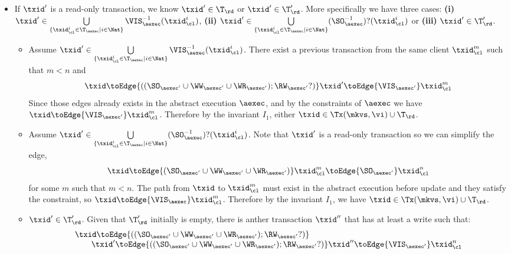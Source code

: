 \begin{itemize}
\begin{itemize}
\item If \( \txid' \) is a read-only transaction, we know \( \txid' \in \T_\rd \) or \( \txid' \in \T'_\rd \).
    More specifically we have three cases: \textbf{(i)} \( \txid' \in \bigcup\limits_{\{\txid_{\cl}^{i} \in \T_{\aexec} \mid i \in \Nat\}} \VIS_{\aexec}^{-1}(\txid^i_\cl) \), \textbf{(ii)} \( \txid' \in \bigcup\limits_{\{\txid_{\cl}^{i} \in \T_{\aexec} \mid i \in \Nat\}} (\SO_{\aexec}^{-1})?(\txid^i_\cl) \) or \textbf{(iii)} \( \txid' \in \T'_\rd\).
    \begin{itemize}
    \item Assume \( \txid' \in \bigcup\limits_{\{\txid_{\cl}^{i} \in \T_{\aexec} \mid i \in \Nat\}} \VIS_{\aexec}^{-1}(\txid^i_\cl) \).
        There exist a previous transaction from the same client \( \txid_\cl^m\) such that \( m < n \) and 
        \[ 
            \txid \toEdge{\left( (\SO_{\aexec'} \cup \WW_{\aexec'} \cup \WR_{\aexec'} ) ; \RW_{\aexec'}? \right) } \txid' \toEdge{\VIS_{\aexec'}}  \txid_\cl^m 
        \]
        Since those edges already exists in the abstract execution \( \aexec\), and by the constraints of \( \aexec \) we have \( \txid \toEdge{\VIS_{\aexec'}} \txid_\cl^m\).
        Therefore by the invariant \( I_1 \), either \( \txid \in \Tx(\mkvs, \vi) \cup \T_\rd \).
    \item Assume \( \txid' \in \bigcup\limits_{\{\txid_{\cl}^{i} \in \T_{\aexec} \mid i \in \Nat\}} (\SO_{\aexec}^{-1})?(\txid^i_\cl) \).
        Note that  \( \txid' \) is a read-only transaction so we can simplify the edge,
        \[ 
            \txid \toEdge{\left( \SO_{\aexec'} \cup \WW_{\aexec'} \cup \WR_{\aexec'}  \right)} \txid_\cl^m \toEdge{\SO_{\aexec'}}  \txid_\cl^n 
        \] 
        for some \( m \) such that \( m < n \).
        The path from \( \txid \) to \( \txid_\cl^m \) must exist in the abstract execution before update and they satisfy the constraint, so \( \txid \toEdge{\VIS_\aexec} \txid_\cl^m \).
        Therefore by the invariant \( I_1 \), we have \( \txid \in \Tx(\mkvs, \vi) \cup \T_\rd \).
    \item \( \txid' \in \T'_\rd \). 
        Given that \( \T'_\rd \) initially is empty, there is anther transaction \( \txid'' \) that has at least a write such that:
        \[
        \begin{array}{l}
            \txid \toEdge{\left( (\SO_{\aexec'} \cup \WW_{\aexec'} \cup \WR_{\aexec'} ) ; \RW_{\aexec'}? \right) } \\
            \qquad \txid' \toEdge{\left( (\SO_{\aexec'} \cup \WW_{\aexec'} \cup \WR_{\aexec'} ) ; \RW_{\aexec'}? \right) } \txid'' \toEdge{\VIS_{\aexec'}}  \txid_\cl^n 

\end{array}\]
\end{itemize}
\end{itemize}
\end{itemize}
